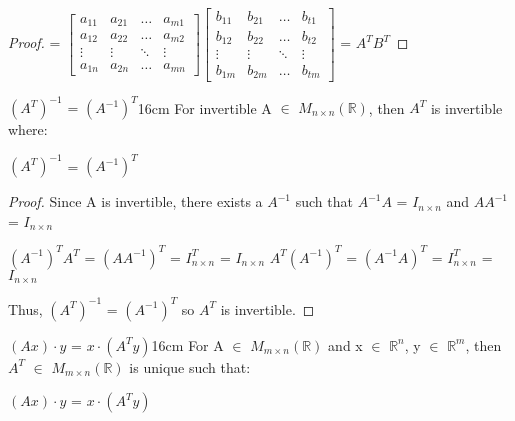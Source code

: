 \begin{proof}
        \hspace{1.15cm}
        =
        $\begin{bmatrix}
            a_{11} & a_{21} & \hdots & a_{m1} \\
            a_{12} & a_{22} & \hdots & a_{m2} \\
            \vdots & \vdots & \ddots & \vdots \\
            a_{1n} & a_{2n} & \hdots & a_{mn}
        \end{bmatrix}
        \begin{bmatrix}
            b_{11} & b_{21} & \hdots & b_{t1} \\
            b_{12} & b_{22} & \hdots & b_{t2} \\
            \vdots & \vdots & \ddots & \vdots \\
            b_{1m} & b_{2m} & \hdots & b_{tm}
        \end{bmatrix}$
        = $A^T B^T$
    \end{proof}

    \vspace{0.5cm}



    \begin{corollary}{$(A^T)^{-1}$ = $(A^{-1})^T$}{16cm}
        For invertible A $\in$ $M_{n \times n}(\mathbb{R})$, then
        $A^T$ is invertible where:
        
        \hspace{0.5cm}
        $(A^T)^{-1}$ = $(A^{-1})^T$
    \end{corollary}

    \begin{proof}
        Since A is invertible, there exists a $A^{-1}$ such that
        $A^{-1}A$ = $I_{n \times n}$ and $AA^{-1}$ = $I_{n \times n}$

        \hspace{0.5cm}
        $(A^{-1})^TA^T$
        = $(AA^{-1})^T$
        = $I_{n \times n}^T$
        = $I_{n \times n}$
        \hspace{1cm}
        $A^T(A^{-1})^T$
        = $(A^{-1}A)^T$
        = $I_{n \times n}^T$
        = $I_{n \times n}$

        Thus, $(A^T)^{-1}$ = $(A^{-1})^T$ so $A^T$ is invertible.
    \end{proof}

    \vspace{0.5cm}



    \begin{corollary}{$(Ax) \cdot y$ = $x \cdot (A^Ty)$}{16cm}
        For A $\in$ $M_{m \times n}(\mathbb{R})$ and x $\in$ $\mathbb{R}^n$,
        y $\in$ $\mathbb{R}^m$, then $A^T$ $\in$ $M_{m \times n}(\mathbb{R})$
        is unique such that:

        \hspace{0.5cm}
        $(Ax) \cdot y$
        = $x \cdot (A^Ty)$
    \end{corollary}

